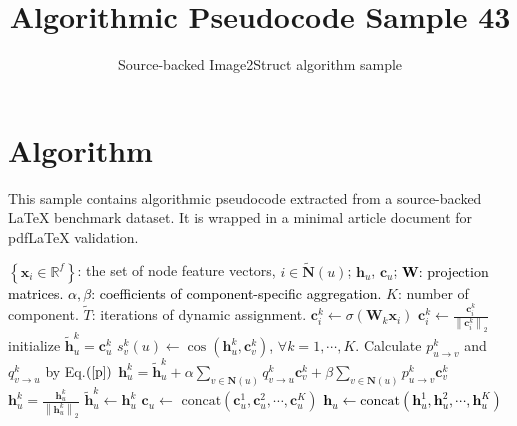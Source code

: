 \documentclass[11pt]{article}
\title{Algorithmic Pseudocode Sample 43}
\author{Source-backed Image2Struct algorithm sample}
\date{}
\begin{document}
\maketitle
\section{Algorithm}
This sample contains algorithmic pseudocode extracted from a source-backed LaTeX benchmark dataset. It is wrapped in a minimal article document for pdfLaTeX validation.

\begin{algorithm}[htbp]
\caption{Source-backed algorithmic procedure}
\begin{algorithm}
[t]
\caption{Procedure of the component-specific aggregation for Micro-disentanglement}
\footnotesize
\begin{algorithmic}[1]
\Require $\left \{ \mathbf{x}_i \in \mathbb{R}^f\right \} $: the set of node feature vectors, $i \in \tilde{\mathbf{N}}\left ( u \right )$;
\Ensure $\mathbf{h}_u$, $\mathbf{c}_u$;
\renewcommand{\algorithmicensure}{\textbf{trainable paramters:}}
\Ensure \textcolor{black}{$\mathbf{W}$: projection matrices.}
\textcolor{black}{$\alpha, \beta$: coefficients of component-specific aggregation.}
\renewcommand{\algorithmicensure}{\textbf{Hyper-paramters:}}
\Ensure $K$: number of component.
$\tilde{T}$: iterations of dynamic assignment.
\State $\mathbf{c}^{k}_i \leftarrow \sigma \left ( \mathbf{W}_k \mathbf{x}_i \right )$
\State $\mathbf{c}^{k}_i \leftarrow \frac{\mathbf{c}^k_i}{\left \| \mathbf{c}^k_i \right \|_{2}} $
\EndFor
\EndFor
\State initialize $\tilde{\mathbf{h}}^{k}_{u} = \mathbf{c}^k_u$
\State $s^k_v(u) \leftarrow \cos(\mathbf{h}^{k}_{u}, \mathbf{c}^{k}_{v})$, $\forall k = 1, \cdots, K$.
\State Calculate $p^k_{u\to v}$ and $q^k_{v \to u}$ by Eq.$\left( \ref{p} \right)$
\EndFor
{}
\State $ {\mathbf{h}^{k}_{u}}= \tilde{\mathbf{h}}^{k}_{u} + \alpha \sum_{v \in \mathbf{N}(u)}q^{k}_{v\to u}\mathbf{c}^{k}_{v} + \beta \sum_{v \in \mathbf{N}(u)}p^{k}_{u \to v}\mathbf{c}^{k}_{v}$
\State $\mathbf{h}^{k}_{u} =\frac{{\mathbf{h}}^{k}_{u}}{\left \| {\mathbf{h}}^{k}_{u} \right \|_{2}} $
\State $\tilde{\mathbf{h}}^{k}_{u} \leftarrow \mathbf{h}^{k}_{u}$
\EndFor
\EndFor
\State $\mathbf{c}_{u} \leftarrow $ $\textrm{concat}(\mathbf{c}^{1}_{u},\mathbf{c}^{2}_{u},\cdots,\mathbf{c}^{K}_{u} )$
\State \textcolor{black}{$\mathbf{h}_{u} \leftarrow \textrm{concat}(\mathbf{h}^{1}_{u},\mathbf{h}^{2}_{u},\cdots,\mathbf{h}^{K}_{u} )$}
\end{algorithmic}
\end{algorithm}
\end{algorithm}
\end{document}
